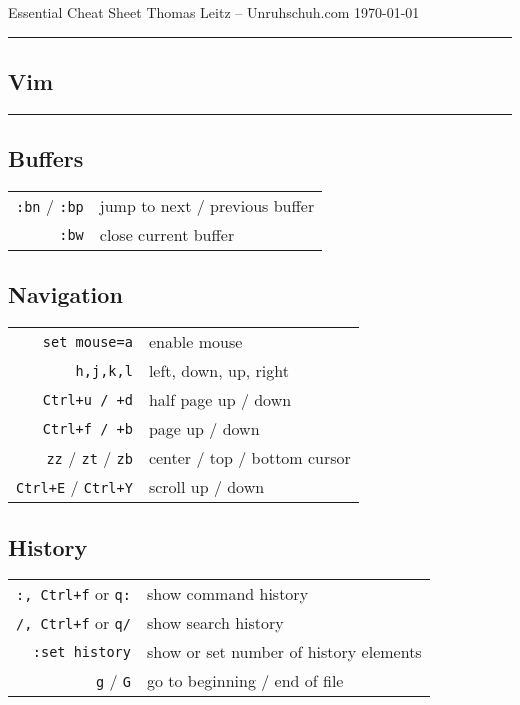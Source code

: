 

\usepackage{easy-todo}

\author{Thomas Leitz (Unruhschuh.com)}
\date{\today}



\raggedcolumns

Essential Cheat Sheet\hfill
Thomas Leitz -- Unruhschuh.com\hfill
\today
\hrule
\vspace*{2pt}

\begin{multicols*}{3}
  

\centering

\section{Vim}
\hrule\vspace*{2pt}
\subsection{Buffers}
\begin{tabular}{@{}rl@{}}
    \verb|:bn| / \verb|:bp| & jump to next / previous buffer \\
    \verb|:bw| & close current buffer
\end{tabular}
\subsection{Navigation}
\begin{tabular}{@{}rl@{}}
    \verb|set mouse=a| & enable mouse \\
    \verb|h,j,k,l|     & left, down, up, right \\
    \verb|Ctrl+u / +d| & half page up / down \\
    \verb|Ctrl+f / +b| & page up / down \\
    \verb|zz| / \verb|zt| / \verb|zb| & center / top / bottom cursor \\
    \verb|Ctrl+E| / \verb|Ctrl+Y| & scroll up / down
\end{tabular}

\subsection{History}
\begin{tabular}{@{}rl@{}}
    \verb|:, Ctrl+f| or \verb|q:| & show command history \\
    \verb|/, Ctrl+f| or \verb|q/| & show search history \\
    \verb|:set history| & show or set number of history elements \\
    \verb|g| / \verb|G| & go to beginning / end of file
\end{tabular}


\end{multicols*}
